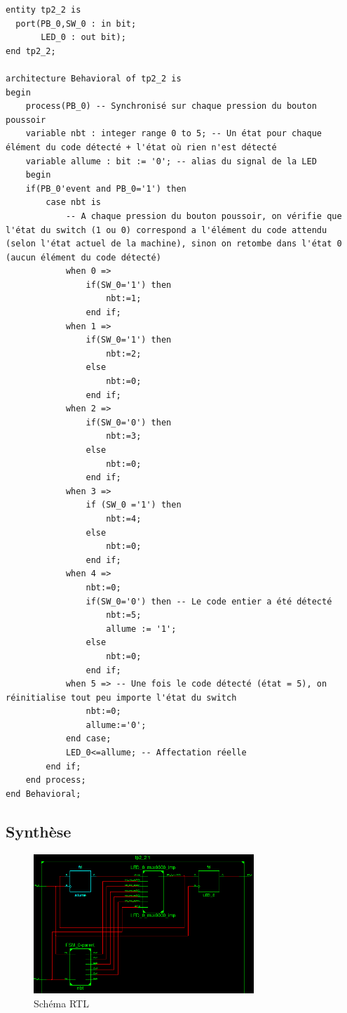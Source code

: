 \vhdl
\begin{lstlisting}
entity tp2_2 is
  port(PB_0,SW_0 : in bit;
       LED_0 : out bit);	
end tp2_2;

architecture Behavioral of tp2_2 is
begin
	process(PB_0) -- Synchronisé sur chaque pression du bouton poussoir
	variable nbt : integer range 0 to 5; -- Un état pour chaque élément du code détecté + l'état où rien n'est détecté
	variable allume : bit := '0'; -- alias du signal de la LED
	begin
	if(PB_0'event and PB_0='1') then
		case nbt is
			-- A chaque pression du bouton poussoir, on vérifie que l'état du switch (1 ou 0) correspond a l'élément du code attendu (selon l'état actuel de la machine), sinon on retombe dans l'état 0 (aucun élément du code détecté)
			when 0 =>
				if(SW_0='1') then
					nbt:=1;
				end if;
			when 1 =>
				if(SW_0='1') then
					nbt:=2;
				else
					nbt:=0;
				end if;
			when 2 =>
				if(SW_0='0') then
					nbt:=3;
				else
					nbt:=0;
				end if;
			when 3 =>
				if (SW_0 ='1') then
					nbt:=4;
				else
					nbt:=0;
				end if;
			when 4 =>
				nbt:=0;
				if(SW_0='0') then -- Le code entier a été détecté
					nbt:=5;
					allume := '1';
				else
					nbt:=0;
				end if;
			when 5 => -- Une fois le code détecté (état = 5), on réinitialise tout peu importe l'état du switch
				nbt:=0;
				allume:='0';
			end case;
			LED_0<=allume; -- Affectation réelle
		end if;
	end process;				
end Behavioral;
\end{lstlisting}

\subsection{Synthèse}

\begin{figure}[!h]
   \centering\includegraphics[width=0.74\textwidth]{files/tp2_2/rtl.png}
   \caption{Schéma RTL}
\end{figure}

